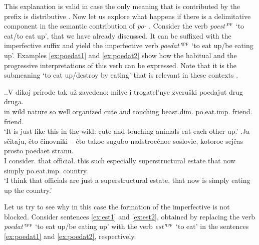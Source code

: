 This explanation is valid in case the only meaning that is contributed by the prefix is distributive . Now let us explore what happens if there is a delimitative  component in the semantic contribution of \textit{po-}  . Consider the verb \textit{poest'}$^{\textsc{pf}}$ `to eat/to eat up', that we have already discussed. It can be suffixed with the imperfective suffix   and yield the imperfective verb  \textit{poedat'}$^{\textsc{ipf}}$ `to eat up/be eating up'. Examples \ref{ex:poedat1} and \ref{ex:poedat2} show how the habitual and the progressive interpretations of this verb can be expressed. Note that it is the submeaning `to eat up/destroy by eating' that is relevant in these contexts  .

\ex.\ag.\label{ex:poedat1}V dikoj prirode tak u\v{z} zavedeno: milye i trogatel'nye zveru\v{s}ki poedajut drug druga.\\
in wild nature so well organized cute and touching beast.dim. po.eat.imp. friend. friend.\\
\trans `It is just like this in the wild: cute and touching animals eat each other up.'
\bg.\label{ex:poedat2}Ja s\v{c}itaju, \v{c}to \v{c}inovniki -- \`{e}to takoe sugubo nadstroe\v{c}noe soslovie, kotoroe sej\v{c}as prosto poedaet stranu.\\
I consider. that official. {} this such especially superstructural estate that now simply po.eat.imp. country.\\
\trans `I think that officials are just a superstructural estate, that now is simply eating up the country.'\\

Let us try to see why in this case the formation of the imperfective is not blocked. Consider sentences \ref{ex:est1} and \ref{ex:est2}, obtained by replacing the verb \textit{poedat'}$^{\textsc{ipf}}$ `to eat up/be eating up' with the verb \textit{est'}$^{\textsc{ipf}}$ `to eat' in the sentences \ref{ex:poedat1} and \ref{ex:poedat2}, respectively.
 
